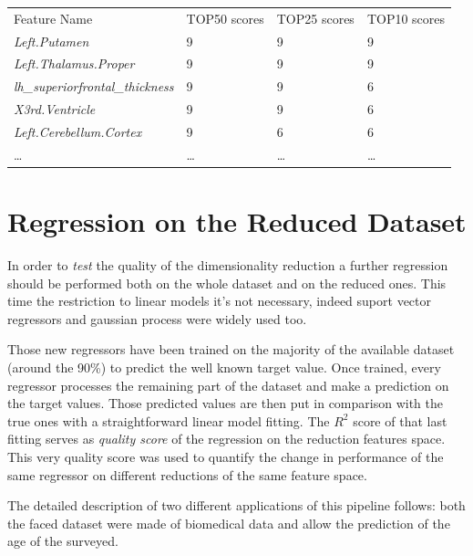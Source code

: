\documentclass{article}
\begin{document}
\begin{table}[ht]
\begin{tabular}{llll}
Feature Name                                        & TOP50 scores & TOP25 scores & TOP10 scores \\
\textit{Left.Putamen}                               & 9             & 9             & 9             \\
\textit{Left.Thalamus.Proper}                       & 9             & 9             & 9             \\
\textit{lh\_superiorfrontal\_thickness}             & 9             & 9             & 6             \\
\textit{X3rd.Ventricle}                             & 9             & 9             & 6             \\
\textit{Left.Cerebellum.Cortex}                     & 9             & 6             & 6             \\
\dots																								& \dots					&\dots 					&\dots
\end{tabular}
\end{table}



\section*{Regression on the Reduced Dataset}
In order to \emph{test} the quality of the dimensionality reduction a further regression should be performed both on the whole dataset and on the reduced ones. This time the restriction to linear models it's not necessary, indeed suport vector regressors and gaussian process were widely used too.

Those new regressors have been trained on the majority of the available dataset (around the 90\%) to predict the well known target value. Once trained, every regressor processes the remaining part of the dataset and make a prediction on the target values. Those predicted values are then put in comparison with the true ones with a straightforward linear model fitting. The $R^2$ score of that last fitting serves as \emph{quality score} of the regression on the reduction features space. This very quality score was used to quantify the change in performance of the same regressor on different reductions of the same feature space.

The detailed description of two different applications of this pipeline follows: both the faced dataset were made of biomedical data and allow the prediction of the age of the surveyed.
\end{document}
